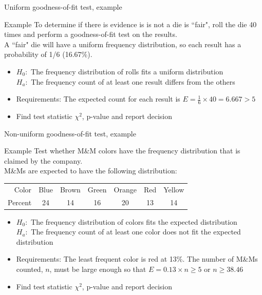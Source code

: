 \documentclass[xcolor=table]{beamer}
\begin{document}
\begin{frame}{Uniform goodness-of-fit test, example}
\begin{exampleblock}{Example}
To determine if there is evidence is is not a die is ``fair", roll the die 40 times and perform a goodness-of-fit test on the results. \\
\medskip
A ``fair" die will have a uniform frequency distribution, so each result has a probability of 1/6 (16.67\%).
\medskip
\begin{itemize}
\pause\item $H_0:$ The frequency distribution of rolls fits a uniform distribution\\
$H_a:$ The frequency count of at least one result differs from the others

\pause\item Requirements: The expected count for each result is $E = \frac 1 6 \times 40 = 6.667 > 5$
\pause\item Find test statistic $\chi^2$, p-value and report decision
\end{itemize}
\end{exampleblock}
\end{frame}

\begin{frame}{Non-uniform goodness-of-fit test, example}
\begin{exampleblock}{Example}
Test whether M\&M colors have the frequency distribution that is claimed by the company.\\
\medskip
M\&Ms are expected to have the following distribution:\\
\smallskip
{\centering
\begin{tabular}{r | c c c c c c }
Color & Blue & Brown & Green & Orange & Red & Yellow\\
Percent & 24 & 14 & 16 & 20 & 13 & 14 
\end{tabular}
\par} 
\medskip

\begin{itemize}
\pause\item $H_0:$ The frequency distribution of colors fits the expected distribution\\
$H_a:$ The frequency count of at least one color does not fit the expected distribution\\
\pause\item Requirements: The least frequent color is red at 13\%. The number of M\&Ms counted, $n$, must be large enough so that $E = 0.13 \times n \ge 5$ or $n \ge 38.46$
\pause\item Find test statistic $\chi^2$, p-value and report decision
\end{itemize}
\end{exampleblock}
\end{frame}
\end{document}
